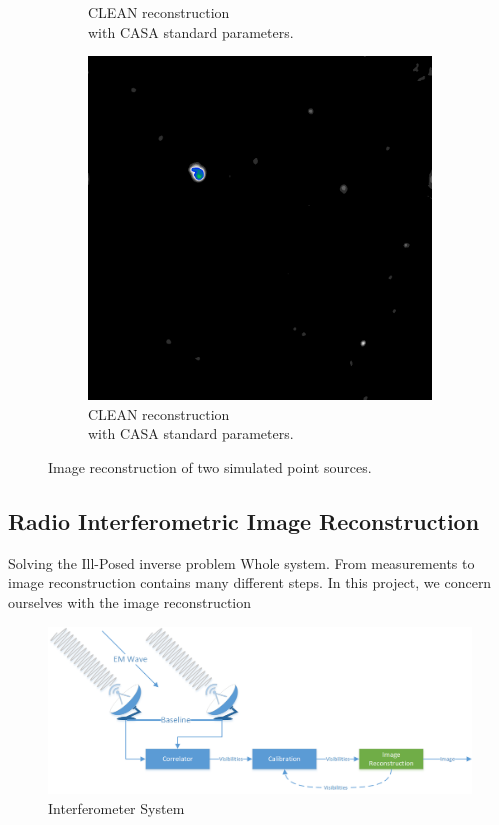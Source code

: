 \begin{figure}[h]
\begin{subfigure}[b]{0.3\linewidth}
	\caption{CLEAN reconstruction \\with CASA standard parameters.}
	\label{results:points:tclean}
	\end{subfigure}
	\begin{subfigure}[b]{0.3\linewidth}
		\includegraphics[width=\linewidth]{./chapters/01.intro/mk2/clean.png}
		\caption{CLEAN reconstruction \\with CASA standard parameters.}
		\label{results:points:tclean}
	\end{subfigure}

	
	\caption{Image reconstruction of two simulated point sources.}
	\label{results:points}
\end{figure}




\subsection{Radio Interferometric Image Reconstruction}

Solving the Ill-Posed inverse problem
Whole system.
From measurements to image reconstruction contains many different steps. In this project, we concern ourselves with the image reconstruction

\begin{figure}[h]
	\centering
	\includegraphics[width=0.80\linewidth]{./chapters/01.intro/system.png}
	\caption{Interferometer System}
	\label{intro:system}
\end{figure}

